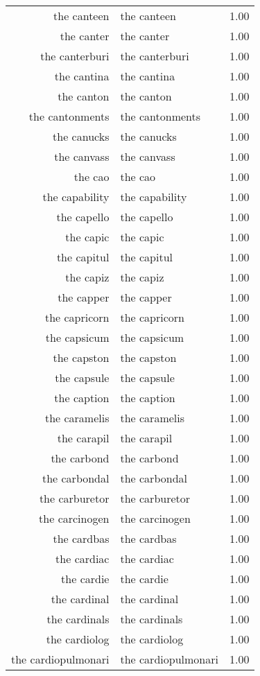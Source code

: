 \begin{table}[ht]
\begin{tabular}{rlr}
  the canteen & the canteen & 1.00 \\ 
  the canter & the canter & 1.00 \\ 
  the canterburi & the canterburi & 1.00 \\ 
  the cantina & the cantina & 1.00 \\ 
  the canton & the canton & 1.00 \\ 
  the cantonments & the cantonments & 1.00 \\ 
  the canucks & the canucks & 1.00 \\ 
  the canvass & the canvass & 1.00 \\ 
  the cao & the cao & 1.00 \\ 
  the capability & the capability & 1.00 \\ 
  the capello & the capello & 1.00 \\ 
  the capic & the capic & 1.00 \\ 
  the capitul & the capitul & 1.00 \\ 
  the capiz & the capiz & 1.00 \\ 
  the capper & the capper & 1.00 \\ 
  the capricorn & the capricorn & 1.00 \\ 
  the capsicum & the capsicum & 1.00 \\ 
  the capston & the capston & 1.00 \\ 
  the capsule & the capsule & 1.00 \\ 
  the caption & the caption & 1.00 \\ 
  the caramelis & the caramelis & 1.00 \\ 
  the carapil & the carapil & 1.00 \\ 
  the carbond & the carbond & 1.00 \\ 
  the carbondal & the carbondal & 1.00 \\ 
  the carburetor & the carburetor & 1.00 \\ 
  the carcinogen & the carcinogen & 1.00 \\ 
  the cardbas & the cardbas & 1.00 \\ 
  the cardiac & the cardiac & 1.00 \\ 
  the cardie & the cardie & 1.00 \\ 
  the cardinal & the cardinal & 1.00 \\ 
  the cardinals & the cardinals & 1.00 \\ 
  the cardiolog & the cardiolog & 1.00 \\ 
  the cardiopulmonari & the cardiopulmonari & 1.00 \\ 

\end{tabular}
\end{table}
